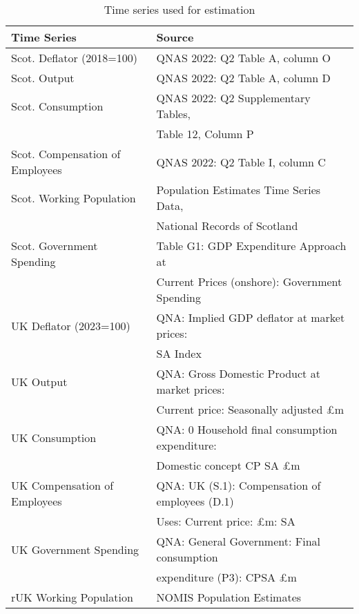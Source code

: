 \begin{table}[H]
    \begin{tabular}{ll}
    \textbf{Time Series} & \textbf{Source}  \\ \hline
    Scot. Deflator (2018=100)         & QNAS 2022: Q2 Table A, column O                                                       \\ 
    Scot. Output                      & QNAS 2022: Q2 Table A, column D                                                       \\
    Scot. Consumption                 & QNAS 2022: Q2 Supplementary Tables, \\& Table 12, Column P                                \\
    Scot. Compensation of Employees & QNAS 2022: Q2 Table I, column C                                                       \\
    Scot. Working Population                & Population Estimates Time Series Data, \\ & National Records of Scotland                   \\
    Scot. Government Spending & Table G1: GDP Expenditure Approach at \\ &Current Prices (onshore): Government Spending \\
    UK Deflator (2023=100)          & QNA: Implied GDP deflator at market prices: \\ &SA Index                                  \\
    UK Output                       & QNA: Gross Domestic Product at market prices:\\ & Current price: Seasonally adjusted £m   \\
    UK Consumption                  & QNA: 0 Household final consumption expenditure:\\ &Domestic concept CP SA £m             \\
    UK Compensation of Employees  & QNA: UK (S.1): Compensation of employees (D.1) \\ & Uses: Current price: £m: SA            \\
    UK Government Spending & QNA: General Government: Final consumption \\ & expenditure (P3): CPSA £m\\
    rUK Working Population                & NOMIS Population Estimates                                                            \\ 
    \end{tabular}
    \caption{Time series used for estimation}
    \label{table:data_for_estimation}
\end{table} 